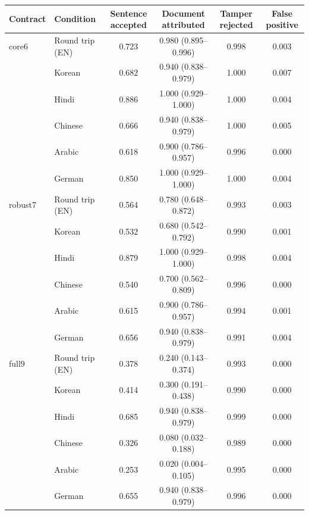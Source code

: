 \begin{tabular}{@{}llcccc@{}}
\toprule
Contract & Condition & Sentence accepted & Document attributed & Tamper rejected & False positive \\
\midrule
core6 & Round trip (EN) & 0.723 & 0.980 (0.895--0.996) & 0.998 & 0.003 \\
 & Korean & 0.682 & 0.940 (0.838--0.979) & 1.000 & 0.007 \\
 & Hindi & 0.886 & 1.000 (0.929--1.000) & 1.000 & 0.004 \\
 & Chinese & 0.666 & 0.940 (0.838--0.979) & 1.000 & 0.005 \\
 & Arabic & 0.618 & 0.900 (0.786--0.957) & 0.996 & 0.000 \\
 & German & 0.850 & 1.000 (0.929--1.000) & 1.000 & 0.004 \\
\midrule
robust7 & Round trip (EN) & 0.564 & 0.780 (0.648--0.872) & 0.993 & 0.003 \\
 & Korean & 0.532 & 0.680 (0.542--0.792) & 0.990 & 0.001 \\
 & Hindi & 0.879 & 1.000 (0.929--1.000) & 0.998 & 0.004 \\
 & Chinese & 0.540 & 0.700 (0.562--0.809) & 0.996 & 0.000 \\
 & Arabic & 0.615 & 0.900 (0.786--0.957) & 0.994 & 0.001 \\
 & German & 0.656 & 0.940 (0.838--0.979) & 0.991 & 0.004 \\
\midrule
full9 & Round trip (EN) & 0.378 & 0.240 (0.143--0.374) & 0.993 & 0.000 \\
 & Korean & 0.414 & 0.300 (0.191--0.438) & 0.990 & 0.000 \\
 & Hindi & 0.685 & 0.940 (0.838--0.979) & 0.999 & 0.000 \\
 & Chinese & 0.326 & 0.080 (0.032--0.188) & 0.989 & 0.000 \\
 & Arabic & 0.253 & 0.020 (0.004--0.105) & 0.995 & 0.000 \\
 & German & 0.655 & 0.940 (0.838--0.979) & 0.996 & 0.000 \\
\bottomrule
\end{tabular}
